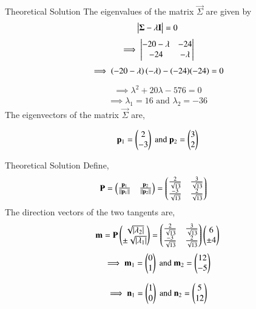 \documentclass{beamer}
\begin{document}
\begin{frame}{Theoretical Solution}
The eigenvalues of the matrix $\vec{\Sigma}$ are given by
\begin{align}
    \begin{vmatrix}\mathbf{\Sigma} - \lambda\mathbf{I}\end{vmatrix} = 0
\end{align}
\begin{align}
    \implies \begin{vmatrix}-20-\lambda & -24 \\ -24 & -\lambda\end{vmatrix}
\end{align}
\begin{align}
    \implies \left(-20-\lambda\right)\left(-\lambda\right)-(-24)(-24)=0
\end{align}
\begin{align}
    \implies \lambda^2 + 20 \lambda - 576 = 0
\end{align}
\begin{align}
    \implies \lambda_1 = 16 \text{ and } \lambda_2 = -36
\end{align}
The eigenvectors of the matrix $\vec{\Sigma}$  are,

\begin{align}
     \mathbf{p}_1 = \begin{pmatrix}2\\-3\end{pmatrix} \text{ and } \mathbf{p}_2 = \begin{pmatrix}3\\2\end{pmatrix}
\end{align}
\end{frame}


\begin{frame}{Theoretical Solution}
Define,
\begin{align}
    \mathbf{P} &= \begin{pmatrix}\frac{\mathbf{p}_1}{\left\lVert\mathbf{p}_1\right\rVert} & \frac{\mathbf{p}_2}{\left\lVert\mathbf{p}_2\right\rVert}\end{pmatrix} = \begin{pmatrix}\frac{2}{\sqrt{13}} & \frac{3}{\sqrt{13}}\\\frac{-3}{\sqrt{13}} & \frac{2}{\sqrt{13}}\end{pmatrix}
\end{align}
The direction vectors of the two tangents are,
\begin{align}
    \mathbf{m}=\mathbf{P}\begin{pmatrix}\sqrt{\left\vert\lambda_2\right\vert} \\ \pm\sqrt{\left\vert\lambda_1\right\vert}\end{pmatrix}=\begin{pmatrix}\frac{2}{\sqrt{13}} & \frac{3}{\sqrt{13}}\\\frac{-3}{\sqrt{13}} & \frac{2}{\sqrt{13}}\end{pmatrix}\begin{pmatrix}6 \\ \pm 4\end{pmatrix}
\end{align}
\begin{align}
\implies \mathbf{m}_1 = \begin{pmatrix}0 \\ 1\end{pmatrix} \text{ and } \mathbf{m}_2 = \begin{pmatrix}12 \\ -5\end{pmatrix}
\end{align}

\begin{align}
\implies \mathbf{n}_1 = \begin{pmatrix}1 \\ 0\end{pmatrix} \text{ and } \mathbf{n}_2 = \begin{pmatrix}5 \\ 12\end{pmatrix}
\end{align}
\end{frame}
\end{document}
